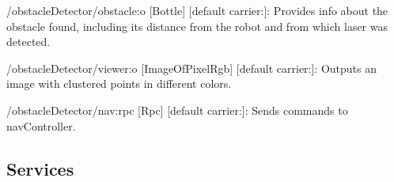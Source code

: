 \begin{DoxyItemize}
\item /obstacle\+Detector/obstacle\+:o \mbox{[}Bottle\mbox{]} \mbox{[}default carrier\+:\mbox{]}\+: Provides info about the obstacle found, including its distance from the robot and from which laser was detected.
\item /obstacle\+Detector/viewer\+:o \mbox{[}Image\+Of\+Pixel\+Rgb\mbox{]} \mbox{[}default carrier\+:\mbox{]}\+: Outputs an image with clustered points in different colors.
\item /obstacle\+Detector/nav\+:rpc \mbox{[}Rpc\mbox{]} \mbox{[}default carrier\+:\mbox{]}\+: Sends commands to nav\+Controller.
\end{DoxyItemize}\hypertarget{group__skeletonViewer_services_sec}{}\subsection{Services}\label{group__skeletonViewer_services_sec}
